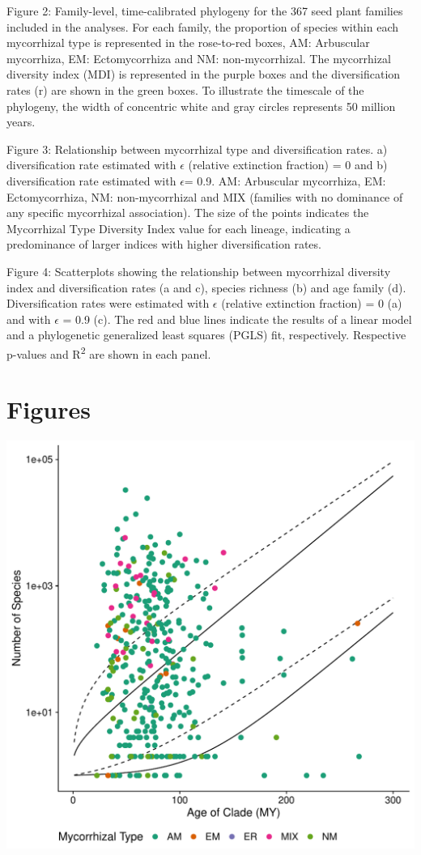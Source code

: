 \documentclass[12pt,]{article}
\begin{document}
Figure 2: Family-level, time-calibrated phylogeny for the 367 seed plant
families included in the analyses. For each family, the proportion of
species within each mycorrhizal type is represented in the rose-to-red
boxes, AM: Arbuscular mycorrhiza, EM: Ectomycorrhiza and NM:
non-mycorrhizal. The mycorrhizal diversity index (MDI) is represented in
the purple boxes and the diversification rates (r) are shown in the
green boxes. To illustrate the timescale of the phylogeny, the width of
concentric white and gray circles represents 50 million years.

Figure 3: Relationship between mycorrhizal type and diversification
rates. a) diversification rate estimated with \(\epsilon\) (relative
extinction fraction) = 0 and b) diversification rate estimated with
\(\epsilon\)= 0.9. AM: Arbuscular mycorrhiza, EM: Ectomycorrhiza, NM:
non-mycorrhizal and MIX (families with no dominance of any specific
mycorrhizal association). The size of the points indicates the
Mycorrhizal Type Diversity Index value for each lineage, indicating a
predominance of larger indices with higher diversification rates.

Figure 4: Scatterplots showing the relationship between mycorrhizal
diversity index and diversification rates (a and c), species richness
(b) and age family (d). Diversification rates were estimated with
\(\epsilon\) (relative extinction fraction) = 0 (a) and with
\(\epsilon\) = 0.9 (c). The red and blue lines indicate the results of a
linear model and a phylogenetic generalized least squares (PGLS) fit,
respectively. Respective p-values and R\textsuperscript{2} are shown in
each panel.

\newpage

\hypertarget{figures}{%
\section{Figures}\label{figures}}

\includegraphics{../output/figs/magsand_stem_nolabel.pdf}
\end{document}
